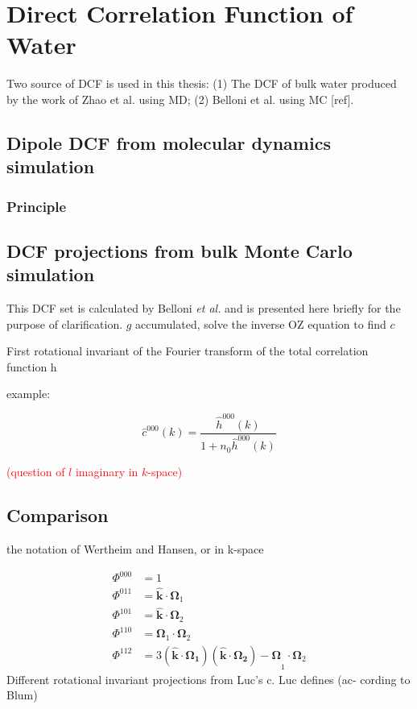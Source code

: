 
\chapter{Direct Correlation Function of Water\label{chpt:dcf-water}}

Two source of DCF is used in this thesis: (1) The \acs{DCF} of bulk
water produced by the work of Zhao et al. using MD; (2) Belloni et
al. using MC {[}ref{]}.

\section{Dipole DCF from molecular dynamics simulation}

\subsection{Principle}

\section{DCF projections from bulk Monte Carlo simulation}

This DCF set is calculated by Belloni \textit{et al.} \citep{Luc_2012}
and is presented here briefly for the purpose of clarification. $g$
accumulated, solve the inverse OZ equation to find $c$

First rotational invariant of the Fourier transform of the total correlation
function h

example:

\[
\hat{c}^{000}(k)=\frac{\hat{h}^{000}(k)}{1+n_{0}\hat{h}^{000}(k)}
\]

\textcolor{red}{(question of $l$ imaginary in $k$-space)}

\section{Comparison}

the notation of Wertheim and Hansen, or in k-space

\begin{align}
\Phi^{000} & =1\nonumber \\
\Phi^{011} & =\hat{\mathbf{k}}\cdot\mathbf{\Omega}_{1}\nonumber \\
\Phi^{101} & =\hat{\mathbf{k}}\cdot\mathbf{\Omega}_{2}\nonumber \\
\Phi^{110} & =\mathbf{\Omega}_{1}\cdot\mathbf{\Omega}_{2}\\
\Phi^{112} & =3\mathbf{(\hat{\mathbf{k}}\cdot\mathbf{\Omega}_{1})(\hat{\mathbf{k}}\cdot\mathbf{\Omega}_{2})-\Omega}_{1}\cdot\mathbf{\Omega}_{2}\nonumber 
\end{align}
Different rotational invariant projections from Luc’s c. Luc defines
(ac- cording to Blum)

